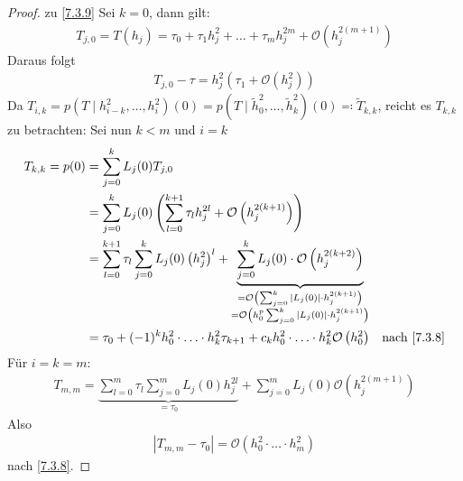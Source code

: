 \documentclass[ngerman,fontsize=11pt, paper=a4, parskip=half, titlepage=true, toc=bib]{scrbook}
\begin{document}
\begin{proof}
  zu \ref{7.3.9}
  Sei $k=0$, dann gilt:
  \begin{gather*}
    T_{j,0} = T(h_j) = \tau_0+\tau_1h_j^2+\ldots+\tau_mh_j^{2m} 
    +\mathcal{O}\left(h_j^{2(m+1)}\right)
  \end{gather*}
  Daraus folgt
  \begin{gather*}
    T_{j,0}-\tau=h_j^2\left(\tau_1+\mathcal{O}( h_j^2)\right)
  \end{gather*}
  Da $T_{i,k}=p(T\mid h_{i-k}^2,\ldots,h_i^2)(0)
  =p(T\mid \widetilde{h}_0^2,\ldots,\widetilde{h}_k^2)(0)
  \eqqcolon \widetilde{T}_{k,k}$, reicht es $T_{k,k}$ zu betrachten:
  Sei nun $k<m$ und $i=k$
  \begin{align*}
    T_{k,k} = p(0) &= \sum_{j=0}^kL_j(0)T_{j,0} \\
                   &= \sum_{j=0}^kL_j(0)\left(
                     \sum_{l=0}^{k+1}\tau_lh_j^{2l}+\mathcal{O}\left(
                     h_j^{2(k+1)}\right)\right)\\
                   &= \sum_{l=0}^{k+1}\tau_l\sum_{j=0}^kL_j(0)\left(h_j^2\right)^l
                     + \underbrace{\sum_{j=0}^kL_j(0)
                     \cdot \mathcal{O}\left(h_j^{2(k+2)}\right)
                     }_{\substack{
                     =\mathcal{O}\left(
                     \sum_{j=0}^k|L_j(0)|\cdot h_j^{2(k+1)}\right) \\
    =\mathcal{O}\left(h_0^p\sum_{j=0}^k|L_j(0)|\cdot h_j^{2(k+1)}\right)
    }}\\
                   &=\tau_0 + (-1)^kh_0^2\cdot\ldots\cdot
                     h_k^2\tau_{k+1}
                     +c_kh_0^2\cdot\ldots\cdot
                     h_k^2\mathcal{O}\left(h_0^2\right)
                   &\text{nach \ref{7.3.8}}
  \end{align*}
  Für $i=k=m$:
  \begin{gather*}
    T_{m,m}=\underbrace{
      \sum_{l=0}^m\tau_l\sum_{j=0}^m
      L_j(0)h_j^{2l}
    }_{=\tau_0}
    +\sum_{j=0}^m L_j(0)\mathcal{O}\left(h_j^{2(m+1)}\right)
  \end{gather*}
  Also 
  \begin{gather*}
    \left| T_{m,m}-\tau_0\right| = \mathcal{O}\left(h_0^2\cdot
      \ldots\cdot h_m^2\right)
  \end{gather*}
  nach \ref{7.3.8}.
\end{proof}
\end{document}
